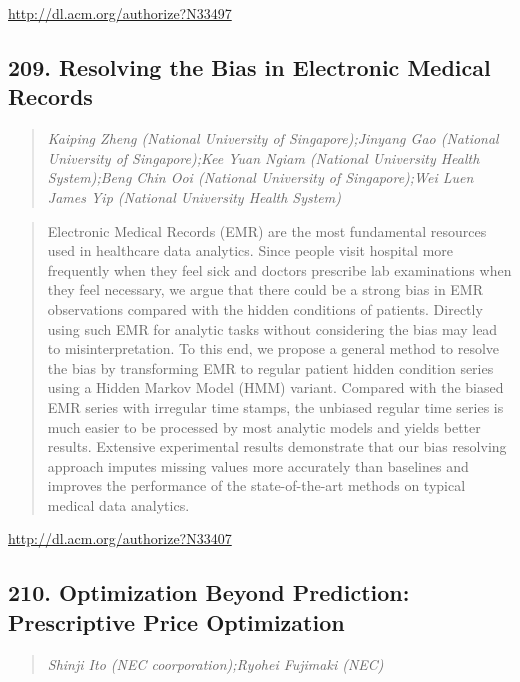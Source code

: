 \documentclass{article}
\begin{document}
\href{http://dl.acm.org/authorize?N33497}{http://dl.acm.org/authorize?N33497}

\subsection{209. Resolving the Bias in Electronic Medical Records}

\begin{quote}
\footnotesize{\textit{Kaiping Zheng (National University of Singapore);Jinyang Gao (National University of Singapore);Kee Yuan Ngiam (National University Health System);Beng Chin Ooi (National University of Singapore);Wei Luen James Yip (National University Health System)}}

\end{quote}

\begin{quote}
Electronic Medical Records (EMR) are the most fundamental resources used in healthcare data analytics. Since people visit hospital more frequently when they feel sick and doctors prescribe lab examinations when they feel necessary, we argue that there could be a strong bias in EMR observations compared with the hidden conditions of patients. Directly using such EMR for analytic tasks without considering the bias may lead to misinterpretation. To this end, we propose a general method to resolve the bias by transforming EMR to regular patient hidden condition series using a Hidden Markov Model (HMM) variant. Compared with the biased EMR series with irregular time stamps, the unbiased regular time series is much easier to be processed by most analytic models and yields better results. Extensive experimental results demonstrate that our bias resolving approach imputes missing values more accurately than baselines and improves the performance of the state-of-the-art methods on typical medical data analytics.
\end{quote}

\href{http://dl.acm.org/authorize?N33407}{http://dl.acm.org/authorize?N33407}

\subsection{210. Optimization Beyond Prediction: Prescriptive Price Optimization}

\begin{quote}
\footnotesize{\textit{Shinji Ito (NEC coorporation);Ryohei Fujimaki (NEC)}}

\end{quote}
\end{document}
